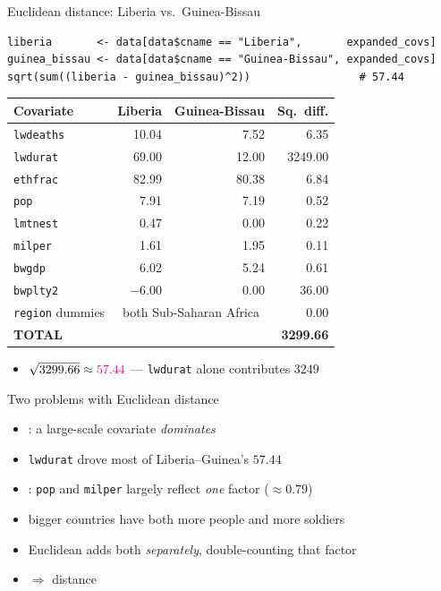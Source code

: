 \documentclass[table, xcolor = {dvipsnames}, 9pt]{beamer}
\theoremstyle{plain}
\newcommand{\mh}[1]{{\color{magenta}{#1}}}
\begin{document}
\begin{frame}[fragile]{Euclidean distance: Liberia vs.\ Guinea-Bissau}
\begin{lstlisting}[style=Rstyle, basicstyle=\ttfamily\tiny, frame=single]
liberia       <- data[data$cname == "Liberia",       expanded_covs]
guinea_bissau <- data[data$cname == "Guinea-Bissau", expanded_covs]
sqrt(sum((liberia - guinea_bissau)^2))                 # 57.44
\end{lstlisting}
\vspace{-0.3em}
\scriptsize
\begin{table}[H]
\centering
\begin{tabular}{lrrr}
\toprule
Covariate & Liberia & Guinea-Bissau & Sq.\ diff. \\
\midrule
\texttt{lwdeaths} & 10.04 & 7.52 & 6.35 \\
\texttt{lwdurat} & 69.00 & 12.00 & 3249.00 \\
\texttt{ethfrac} & 82.99 & 80.38 & 6.84 \\
\texttt{pop} & 7.91 & 7.19 & 0.52 \\
\texttt{lmtnest} & 0.47 & 0.00 & 0.22 \\
\texttt{milper} & 1.61 & 1.95 & 0.11 \\
\texttt{bwgdp} & 6.02 & 5.24 & 0.61 \\
\texttt{bwplty2} & $-6.00$ & 0.00 & 36.00 \\
\texttt{region} dummies & \multicolumn{2}{c}{\footnotesize both Sub-Saharan Africa} & 0.00 \\
\midrule
\textbf{TOTAL} & & & \textbf{3299.66} \\
\bottomrule
\end{tabular}
\end{table}
\normalsize
\vspace{-0.2em}
\begin{itemize}
\item $\sqrt{3299.66} \approx \mh{57.44}$ --- \texttt{lwdurat} alone contributes $3249$ \vfill
\end{itemize}
\end{frame}
\begin{frame}[t]{Two problems with Euclidean distance}
\vfill
\begin{itemize} \vfill
\item \mh{Scale}: a large-scale covariate \emph{dominates} \vfill 
\item[] \texttt{lwdurat} drove most of Liberia--Guinea's $57.44$ \vfill
\item \mh{Correlation}: \texttt{pop} and \texttt{milper} largely reflect \emph{one} factor ($\approx 0.79$) \vfill
\item[] bigger countries have both more people and more soldiers \vfill
\item Euclidean adds both \emph{separately}, double-counting that factor \vfill
\item[] $\Rightarrow$ \mh{inflated} distance \vfill
\end{itemize} \vfill
\end{frame}
\end{document}
